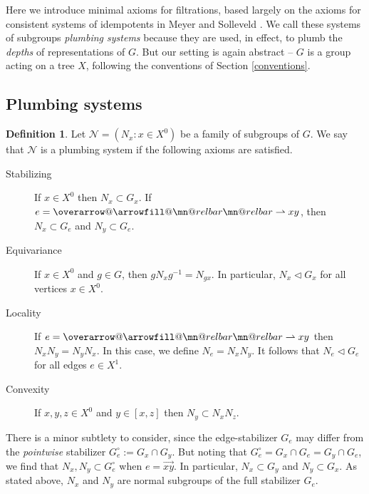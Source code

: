 \documentclass[letter]{amsart}
\makeatletter
\theoremstyle{definition}
\newtheorem{definition}[thm]{Definition}
\theoremstyle{remark}
\numberwithin{thm}{section}
\numberwithin{equation}{section}
\DeclareRobustCommand{\overrightharpoon}{\mathpalette{\overarrow@\rightharpoonfill@}}
\def\rightharpoonfill@{\arrowfill@\mn@relbar\mn@relbar\rightharpoonup}
\newcommand{\edge}[1]{\overrightharpoon{#1}}
\renewcommand{\NN}{{\mathcal N}}
\newcommand{\ltr}{\triangleleft}
\makeatother
\begin{document}
Here we introduce minimal axioms for filtrations, based largely on the axioms for consistent systems of idempotents in Meyer and Solleveld \cite[Definition 2.1]{MS}.  We call these systems of subgroups {\em plumbing systems} because they are used, in effect, to plumb the {\em depths} of representations of $G$.  But our setting is again abstract -- $G$ is a group acting on a tree $X$, following the conventions of Section \ref{conventions}.

\subsection{Plumbing systems}

\begin{definition}
Let $\NN = (N_x : x \in X^0)$ be a family of subgroups of $G$.  We say that $\NN$ is a plumbing system if the following axioms are satisfied.
\begin{description}
\item[Stabilizing]  If $x \in X^0$ then $N_x \subset G_x$.  If $e = \edge{xy}$, then $N_x \subset G_e$ and $N_y \subset G_e$.  
\item[Equivariance]  If $x \in X^0$ and $g \in G$, then $g N_x g^{-1} = N_{gx}$.  In particular, $N_x \ltr G_x$ for all vertices $x \in X^0$.
\item[Locality] If $e = \edge{xy}$ then $N_x N_y = N_y N_x$.  In this case, we define $N_e = N_x N_y$.  It follows that $N_e \ltr G_e$ for all edges $e \in X^1$.
\item[Convexity]  If $x,y,z \in X^0$ and $y \in [x,z]$ then $N_y \subset N_x N_z$.  
\end{description}
\end{definition}

There is a minor subtlety to consider, since the edge-stabilizer $G_e$ may differ from the {\em pointwise} stabilizer $G_e^\circ := G_x \cap G_y$.  But noting that $G_e^\circ = G_x \cap G_e = G_y \cap G_e$, we find that $N_x, N_y \subset G_e^\circ$ when $e = \vec{xy}$.  In particular, $N_x \subset G_y$ and $N_y \subset G_x$.  As stated above, $N_x$ and $N_y$ are normal subgroups of the full stabilizer $G_e$.
\end{document}

